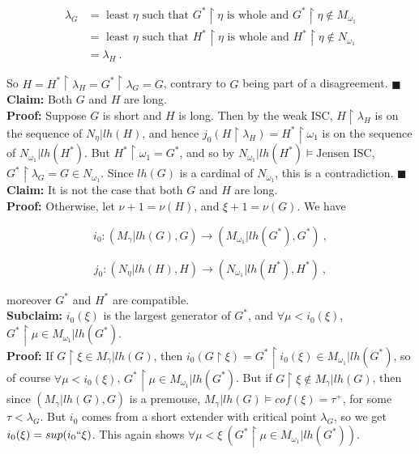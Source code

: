 \documentclass[12pt]{article}
\begin{document}
\[
\begin{split}
\lambda_G & = \text{ least $\eta$ such that }G^* \restriction \eta \text{ is whole and } G^* \restriction \eta \notin M_{\omega_1}\\
& = \text{ least $\eta$ such that }H^* \restriction \eta \text{ is whole and } H^* \restriction \eta \notin N_{\omega_1}\\
& = \lambda_H \ .
\end{split}
\]

So $H = H^* \restriction \lambda_H = G^* \restriction \lambda_G = G$, contrary to $G$ being part of a disagreement. $\blacksquare$\\

\textbf{Claim:} Both $G$ and $H$ are long.\\

\indent \indent \textbf{Proof:} Suppose $G$ is short and $H$ is long.  Then by the weak ISC, $H \restriction \lambda_H$ is on the sequence of $N_\eta | lh (H)$, and hence $j_0 (H \restriction \lambda_H) = H^* \restriction \omega_1$ is on the sequence of $N_{\omega_1} | lh(H^*)$.  But $H^* \restriction \omega_1 = G^*$, and so by $N_{\omega_1} | lh(H^*) \models \text{Jensen ISC}$, $G^* \restriction \lambda_G = G \in N_{\omega_1}$.  Since $lh(G)$ is a cardinal of $N_{\omega_1}$, this is a contradiction. $\blacksquare$\\

\textbf{Claim:} It is not the case that both $G$ and $H$ are long.\\


\indent \indent \textbf{Proof:} Otherwise, let $\nu + 1 = \nu (H)$, and $\xi + 1 = \nu (G)$.  We have

\[
i_0 : (M_\gamma | lh(G), G ) \longrightarrow (M_{\omega_1} | lh(G^* ), G^* ) \ ,
\]

\[
j_0 : (N_\eta | lh(H), H ) \longrightarrow (N_{\omega_1} | lh(H^* ), H^* ) \ ,
\]

moreover $G^*$ and $H^*$ are compatible.\\

\textbf{Subclaim:} $i_0 (\xi)$ is the largest generator of $G^*$, and $\forall \mu < i_0 (\xi)$, $G^* \restriction \mu \in M_{\omega_1} | lh(G^*)$.\\

\indent \indent \textbf{Proof:} If $G \restriction \xi \in M_\gamma | lh(G)$, then $i_0 (G \restriction \xi) = G^* \restriction i_0 (\xi) \in M_{\omega_1} | lh(G^*)$, so of course $\forall \mu < i_0 (\xi)$, $G^* \restriction \mu \in M_{\omega_1} | lh (G^*)$.  But if $G \restriction \xi \notin M_\gamma | lh(G)$, then since $( M_\gamma | lh(G), G)$ is a premouse, $M_\gamma | lh(G) \models cof (\xi) = \tau^+$, for some $\tau < \lambda_G$.  But $i_0$ comes from a short extender with critical point $\lambda_G$, so we get $i_0 (\xi) = sup (i_0 `` \xi)$.  This again shows $\forall \mu < \xi \ ( G^* \restriction \mu \in M_{\omega_1} | lh(G^*))$.\\
\end{document}
